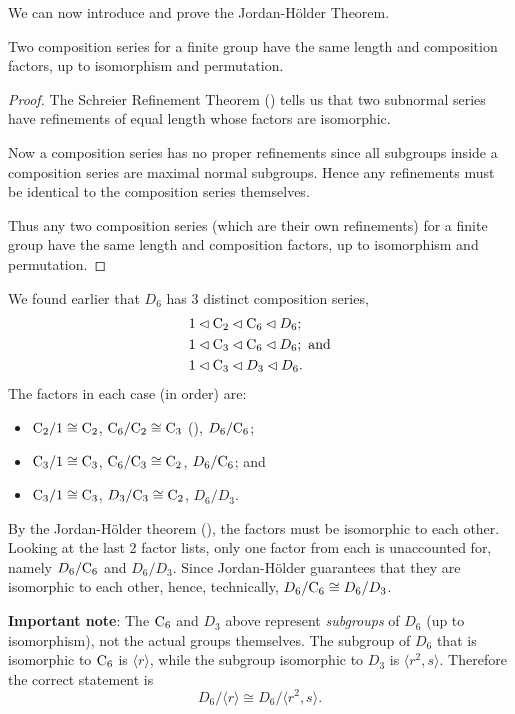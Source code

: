 We can now introduce and prove the Jordan-H\"older Theorem.

\begin{theorem}\label{thrm-jordan-holder}
    Two composition series for a finite group have the same length and composition factors, up to isomorphism and permutation.
\end{theorem}
\begin{proof}
    The Schreier Refinement Theorem () tells us that two subnormal series have refinements of equal length whose factors are isomorphic.

    Now a composition series has no proper refinements since all subgroups inside a composition series are maximal normal subgroups. Hence any refinements must be identical to the composition series themselves.

    Thus any two composition series (which are their own refinements) for a finite group have the same length and composition factors, up to isomorphism and permutation.
\end{proof}

\begin{example}
    We found earlier that $D_6$ has 3 distinct composition series,
    \begin{align*}
        &1 \lhd \mathrm{C}_{2} \lhd \mathrm{C}_{6} \lhd D_6;\\
        &1 \lhd \mathrm{C}_{3} \lhd \mathrm{C}_{6} \lhd D_6; \text{ and}\\
        &1 \lhd \mathrm{C}_{3} \lhd D_3 \lhd D_6.
    \end{align*}
    The factors in each case (in order) are:
    \begin{itemize}
        \item $\mathrm{C}_{2}/1 \cong \mathrm{C}_{2}$, $\mathrm{C}_{6}/\mathrm{C}_{2} \cong \mathrm{C}_{3}$ (), $D_6 / \mathrm{C}_{6}$;
        \item $\mathrm{C}_{3}/1 \cong \mathrm{C}_{3}$, $\mathrm{C}_{6}/\mathrm{C}_{3} \cong \mathrm{C}_{2}$, $D_6 / \mathrm{C}_{6}$; and
        \item $\mathrm{C}_{3}/1 \cong \mathrm{C}_{3}$, $D_3 / \mathrm{C}_{3} \cong \mathrm{C}_{2}$, $D_6 / D_3$.
    \end{itemize}
    By the Jordan-H\"older theorem (), the factors must be isomorphic to each other. Looking at the last 2 factor lists, only one factor from each is unaccounted for, namely $D_6 / \mathrm{C}_{6}$ and $D_6 / D_3$. Since Jordan-H\"older guarantees that they are isomorphic to each other, hence, technically, $D_6 / \mathrm{C}_{6} \cong D_6 / D_3$.

    \textbf{Important note}: The $\mathrm{C}_{6}$ and $D_3$ above represent \textit{subgroups} of $D_6$ (up to isomorphism), not the actual groups themselves. The subgroup of $D_6$ that is isomorphic to $\mathrm{C}_{6}$ is $\langle r \rangle$, while the subgroup isomorphic to $D_3$ is $\langle r^2, s\rangle$. Therefore the correct statement is
    \[
        D_6 / \langle r \rangle \cong D_6 / \langle r^2, s\rangle.
    \]
\end{example}

